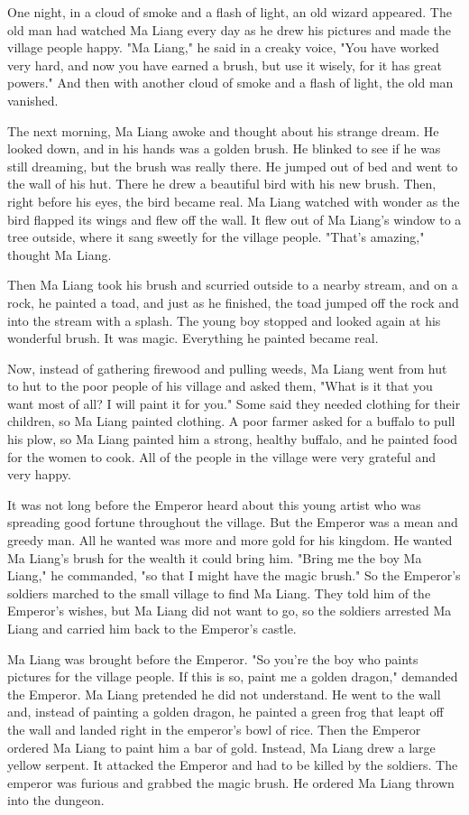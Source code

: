 One night, in a cloud of smoke and a flash of light, an old wizard appeared. The old man had watched Ma Liang every day as he drew his pictures and made the village people happy. "Ma Liang," he said in a creaky voice, "You have worked very hard, and now you have earned a brush, but use it wisely, for it has great powers." And then with another cloud of smoke and a flash of light, the old man vanished.

The next morning, Ma Liang awoke and thought about his strange dream. He looked down, and in his hands was a golden brush. He blinked to see if he was still dreaming, but the brush was really there. He jumped out of bed and went to the wall of his hut. There he drew a beautiful bird with his new brush. Then, right before his eyes, the bird became real. Ma Liang watched with wonder as the bird flapped its wings and flew off the wall. It flew out of Ma Liang's window to a tree outside, where it sang sweetly for the village people. "That's amazing," thought Ma Liang.

Then Ma Liang took his brush and scurried outside to a nearby stream, and on a rock, he painted a toad, and just as he finished, the toad jumped off the rock and into the stream with a splash. The young boy stopped and looked again at his wonderful brush. It was magic. Everything he painted became real.

Now, instead of gathering firewood and pulling weeds, Ma Liang went from hut to hut to the poor people of his village and asked them, "What is it that you want most of all? I will paint it for you." Some said they needed clothing for their children, so Ma Liang painted clothing. A poor farmer asked for a buffalo to pull his plow, so Ma Liang painted him a strong, healthy buffalo, and he painted food for the women to cook. All of the people in the village were very grateful and very happy.

It was not long before the Emperor heard about this young artist who was spreading good fortune throughout the village. But the Emperor was a mean and greedy man. All he wanted was more and more gold for his kingdom. He wanted Ma Liang's brush for the wealth it could bring him. "Bring me the boy Ma Liang," he commanded, "so that I might have the magic brush." So the Emperor's soldiers marched to the small village to find Ma Liang. They told him of the Emperor's wishes, but Ma Liang did not want to go, so the soldiers arrested Ma Liang and carried him back to the Emperor's castle.

Ma Liang was brought before the Emperor. "So you're the boy who paints pictures for the village people. If this is so, paint me a golden dragon," demanded the Emperor. Ma Liang pretended he did not understand. He went to the wall and, instead of painting a golden dragon, he painted a green frog that leapt off the wall and landed right in the emperor's bowl of rice. Then the Emperor ordered Ma Liang to paint him a bar of gold. Instead, Ma Liang drew a large yellow serpent. It attacked the Emperor and had to be killed by the soldiers. The emperor was furious and grabbed the magic brush. He ordered Ma Liang thrown into the dungeon.

